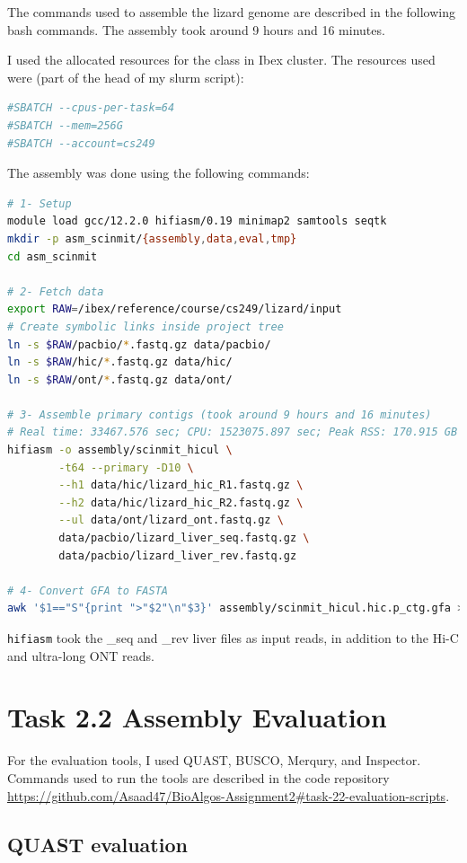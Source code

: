 \documentclass[12pt]{article}
\begin{document}
The commands used to assemble the lizard genome are described in the following bash commands. The assembly took around 9 hours and 16 minutes.

I used the allocated resources for the class in Ibex cluster. The resources used were (part of the head of my slurm script):

\begin{lstlisting}[language=bash]
#SBATCH --cpus-per-task=64
#SBATCH --mem=256G
#SBATCH --account=cs249
\end{lstlisting}

The assembly was done using the following commands:

\begin{lstlisting}[language=bash]
# 1- Setup
module load gcc/12.2.0 hifiasm/0.19 minimap2 samtools seqtk
mkdir -p asm_scinmit/{assembly,data,eval,tmp}
cd asm_scinmit

# 2- Fetch data
export RAW=/ibex/reference/course/cs249/lizard/input
# Create symbolic links inside project tree
ln -s $RAW/pacbio/*.fastq.gz data/pacbio/
ln -s $RAW/hic/*.fastq.gz data/hic/
ln -s $RAW/ont/*.fastq.gz data/ont/

# 3- Assemble primary contigs (took around 9 hours and 16 minutes)
# Real time: 33467.576 sec; CPU: 1523075.897 sec; Peak RSS: 170.915 GB
hifiasm -o assembly/scinmit_hicul \
        -t64 --primary -D10 \
        --h1 data/hic/lizard_hic_R1.fastq.gz \
        --h2 data/hic/lizard_hic_R2.fastq.gz \
        --ul data/ont/lizard_ont.fastq.gz \
        data/pacbio/lizard_liver_seq.fastq.gz \
        data/pacbio/lizard_liver_rev.fastq.gz

# 4- Convert GFA to FASTA
awk '$1=="S"{print ">"$2"\n"$3}' assembly/scinmit_hicul.hic.p_ctg.gfa > assembly/scinmit_hicul.hic.p_ctg.fa
\end{lstlisting}

\texttt{hifiasm} took the \_seq and \_rev liver files as input reads, in addition to the Hi-C and ultra-long ONT reads. 

\section{Task 2.2 Assembly Evaluation}

For the evaluation tools, I used QUAST, BUSCO, Merqury, and Inspector. Commands used to run the tools are described in the code repository \url{https://github.com/Asaad47/BioAlgos-Assignment2#task-22-evaluation-scripts}.

\subsection{QUAST evaluation}
\end{document}

